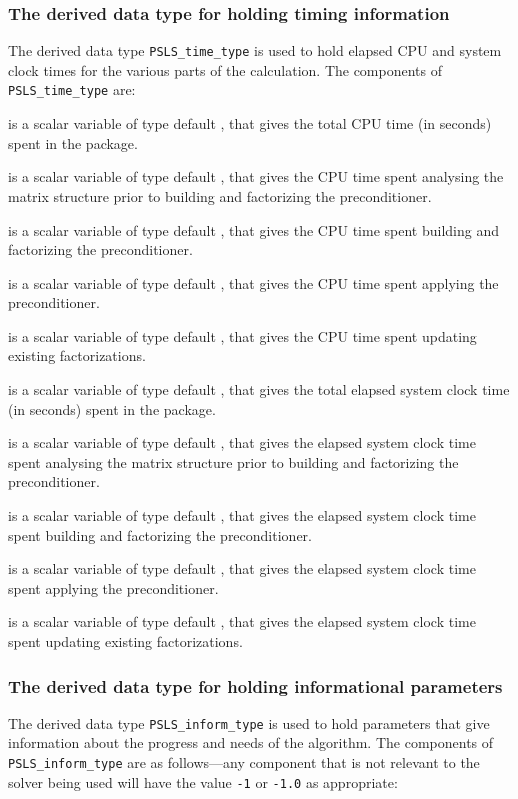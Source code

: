 \documentclass{galahad}
\newcommand{\packagename}{PSLS}
\begin{document}
\subsubsection{The derived data type for holding timing
 information}\label{typetime}
The derived data type
{\tt \packagename\_time\_type}
is used to hold elapsed CPU and system clock times for the various parts
of the calculation. The components of
{\tt \packagename\_time\_type}
are:
\begin{description}
 is a scalar variable of type default \realdp, that gives
 the total CPU time (in seconds) spent in the package.

 is a scalar variable of type default \realdp, that gives
 the CPU time spent analysing the matrix structure prior to building and
 factorizing the preconditioner.

 is a scalar variable of type default \realdp, that gives
 the CPU time spent building and factorizing the preconditioner.

 is a scalar variable of type default \realdp, that gives
 the CPU time spent applying the preconditioner.

 is a scalar variable of type default \realdp, that gives
 the CPU time spent updating existing factorizations.

 is a scalar variable of type default \realdp, that gives
 the total elapsed system clock time (in seconds) spent in the package.

 is a scalar variable of type default \realdp, that gives
 the elapsed system clock time spent analysing the matrix structure prior to 
 building and factorizing the preconditioner.

 is a scalar variable of type default \realdp, that gives
 the elapsed system clock time spent building and factorizing the 
 preconditioner.

 is a scalar variable of type default \realdp, that gives
 the elapsed system clock time spent applying the preconditioner.

 is a scalar variable of type default \realdp,
 that gives  the elapsed system clock time spent updating existing 
 factorizations.

\end{description}


\subsubsection{The derived data type for holding informational
 parameters}\label{typeinform}
The derived data type
{\tt \packagename\_inform\_type}
is used to hold parameters that give information about the progress and needs
of the algorithm. The components of
{\tt \packagename\_inform\_type}
are as follows---any component that is not relevant to the solver being used
will have the value {\tt -1} or {\tt -1.0} as appropriate:
\end{document}
